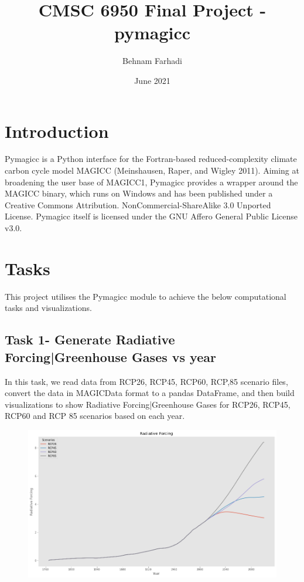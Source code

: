 \documentclass{article}
\title{CMSC 6950 Final Project - pymagicc}
\author{Behnam Farhadi}
\date{June 2021}
\begin{document}
\maketitle

\section{Introduction}
Pymagicc\cite{Gieseke2018} is a Python interface for the Fortran-based reduced-complexity climate carbon cycle model MAGICC (Meinshausen, Raper, and Wigley 2011). Aiming at broadening the user base of MAGICC1, Pymagicc provides a wrapper around the MAGICC binary, which runs on Windows and has been published under a Creative Commons Attribution. NonCommercial-ShareAlike 3.0 Unported License. Pymagicc itself is licensed under the GNU Affero General Public License v3.0.

\section{Tasks}
This project utilises the Pymagicc module to achieve the below computational tasks and visualizations.

\subsection{ Task 1- Generate Radiative Forcing|Greenhouse Gases vs year}
In this task, we read data from RCP26, RCP45, RCP60, RCP,85 scenario files, convert the data in
MAGICData format to a pandas DataFrame, and then build visualizations to show Radiative 
Forcing|Greenhouse Gases for RCP26, RCP45, RCP60 and RCP 85 scenarios based on each 
year. 
\begin{figure}[h]
\includegraphics[width=\textwidth,height=\textheight,keepaspectratio]{Radioactive.png}
\end{figure}
\end{document}
